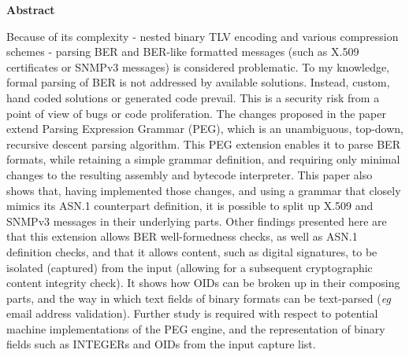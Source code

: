 \textbf{Abstract}

Because of its complexity - nested binary TLV encoding and various
compression schemes -
parsing BER and BER-like formatted messages (such as X.509 certificates or SNMPv3
messages) is considered problematic. To my
knowledge, formal parsing of BER is not
addressed by available solutions. Instead, custom, hand
coded solutions or generated code prevail. This is a security risk from a
point of view of bugs or code proliferation. The changes proposed in the
paper extend Parsing Expression Grammar
(PEG), which is an unambiguous, top-down, recursive descent parsing algorithm.
This PEG extension enables it to parse BER formats, while retaining a
simple grammar definition, and requiring only minimal changes to the
resulting assembly and bytecode interpreter. This paper also shows that,
having implemented those changes, and using a grammar that closely mimics
its ASN.1 counterpart definition, it is possible to split up X.509 and SNMPv3
messages in their underlying parts. Other findings presented here
are that this extension allows BER well-formedness checks, as well as ASN.1
definition checks, and that it allows content, such as digital
signatures, to be isolated (captured) from the input (allowing for a subsequent
cryptographic content integrity check). It shows how OIDs
can be broken up in their composing parts, and the way in which text
fields of binary formats can be text-parsed (\textit{eg} email address
validation). Further study is required with respect to potential machine
implementations of the PEG engine, and the representation of binary
fields such as INTEGERs and OIDs from the input capture list.
